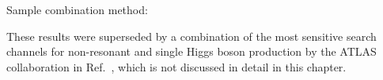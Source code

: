 
Sample combination method:~\cite{ATL-PHYS-PUB-2019-007}



These results were superseded by a combination of the most sensitive
search channels for non-resonant \HH and single Higgs boson production
by the ATLAS collaboration in Ref.~\cite{ATLAS-CONF-2022-050}, which
is not discussed in detail in this chapter.


